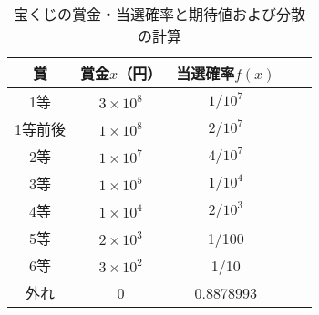 %
\begin{table}[H]
    \centering
    \caption{宝くじの賞金・当選確率と期待値および分散の計算}
    \label{tb:takara}
    \begin{tabular}{ccccc}
    \hline
        賞  & 賞金$ x $（円） & 当選確率$ f(x) $ &  \\ \hline
        1等 & $ 3\times 10^{8} $ & $ 1/10^{7} $ &\\ 
        1等前後 & $ 1\times 10^{8} $ & $ 2/10^{7} $ &\\ 
        2等 &  $ 1\times 10^{7} $ & $ 4/10^{7} $ & \\ 
        3等 &  $ 1\times 10^{5} $ & $ 1/10^{4} $ &\\ 
        4等 &  $ 1\times 10^{4} $ & $ 2/10^{3} $ &\\ 
        5等 &  $ 2\times 10^{3} $ & 1/100 &  \\ 
        6等 &  $ 3\times 10^{2} $ & 1/10 &  \\ 
        外れ &  0 & 0.8878993 &  \\ \hline
    \end{tabular}
\end{table}
%

\clearpage

